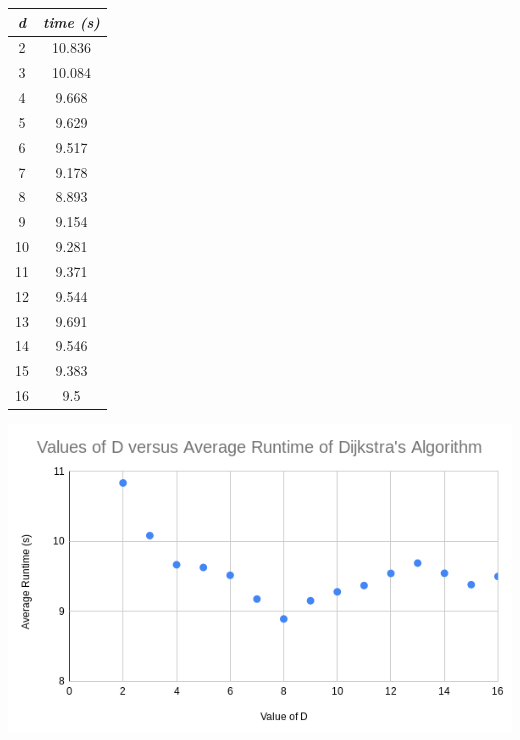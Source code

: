 \documentclass[a4paper,10pt]{article}
\begin{document}
{\centering
\begin{table}[H]
\begin{tabular}{|c|c|}
\hline
\textit{d} & \textit{time (s)} \\ \hline
2          & 10.836            \\ \hline
3          & 10.084            \\ \hline
4          & 9.668             \\ \hline
5          & 9.629             \\ \hline
6          & 9.517             \\ \hline
7          & 9.178             \\ \hline
8          & 8.893             \\ \hline
9          & 9.154             \\ \hline
10         & 9.281             \\ \hline
11         & 9.371             \\ \hline
12         & 9.544             \\ \hline
13         & 9.691             \\ \hline
14         & 9.546             \\ \hline
15         & 9.383             \\ \hline
16         & 9.5               \\ \hline
\end{tabular}
\end{table}
}
\includegraphics{graph.png}

\newpage
\end{document}
